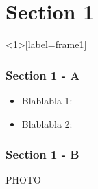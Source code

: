 \documentclass{beamer}
\begin{document}
\section{Section 1}

\begin{frame}<1>[label=frame1]
    \frametitle{Section 1 - A}
    \begin{itemize}
        \item <1-> Blablabla 1:
        \item <2-> Blablabla 2:
    \end{itemize}
\end{frame}

\begin{frame}\frametitle{Section 1 - B}
    PHOTO
\end{frame}

\end{document}

